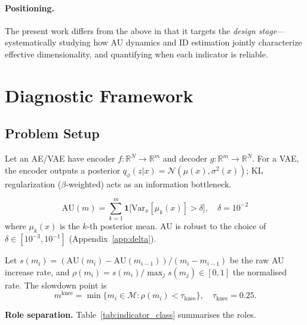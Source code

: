 \documentclass[make,article,submit,pdftex,moreauthors]{Definitions/mdpi}
\newcommand{\R}{\mathbb{R}}
\newcommand{\mknee}{m^{\mathrm{knee}}}
\begin{document}
\paragraph{Positioning.}
The present work differs from the above in that it targets the \emph{design
stage}—systematically studying how AU dynamics and ID estimation jointly
characterize effective dimensionality, and quantifying when each indicator is
reliable.

\section{Diagnostic Framework}\label{sec:framework}

\subsection{Problem Setup}\label{sec:framework_setup}

Let an AE/VAE have encoder $f:\R^N\!\to\R^m$ and decoder $g:\R^m\!\to\R^N$.
For a VAE, the encoder outputs a posterior $q_\phi(z|x)=\mathcal{N}(\mu(x),\sigma^2(x))$;
KL regularization ($\beta$-weighted) acts as an information bottleneck.

\begin{definition}
\begin{equation}
  \mathrm{AU}(m)=\sum_{k=1}^{m}\mathbf{1}\bigl[\mathrm{Var}_x[\mu_k(x)]>\delta\bigr],
  \quad\delta=10^{-2}
  \label{eq:au_def}
\end{equation}
where $\mu_k(x)$ is the $k$-th posterior mean.
AU is robust to the choice of $\delta\in[10^{-3},10^{-1}]$ (Appendix~\ref{app:delta}).
\end{definition}

\begin{definition}
Let $s(m_i)=({\mathrm{AU}(m_i)-\mathrm{AU}(m_{i-1})})/({m_i-m_{i-1}})$
be the raw AU increase rate, and
$\rho(m_i)=s(m_i)/\max_j s(m_j)\in[0,1]$ the normalised rate.
The slowdown point is
\begin{equation}
  \mknee=\min\{m_i\in\mathcal{M}:\rho(m_i)<\tau_{\mathrm{knee}}\},
  \quad\tau_{\mathrm{knee}}=0.25.
  \label{eq:mknee}
\end{equation}
\end{definition}

\textbf{Role separation.} Table~\ref{tab:indicator_class} summarises the roles.
\end{document}
